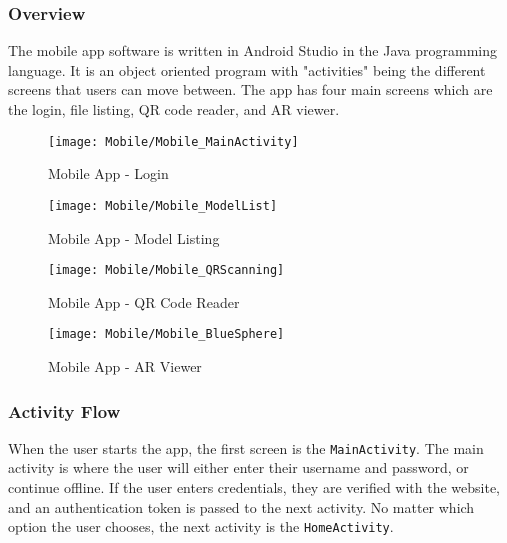     \subsubsection{Overview}
        
        The mobile app software is written in Android Studio in the Java programming language. It is an object oriented program with "activities" being the different screens that users can move between. The app has four main screens which are the login, file listing, QR code reader, and AR viewer.
        
        \begin{figure}[H]
            \texttt{[image: Mobile/Mobile\_MainActivity]}
            \centering
            \caption{Mobile App - Login}
            \label{fig:mobileLoginActivity}
        \end{figure}

        \begin{figure}[H]
            \texttt{[image: Mobile/Mobile\_ModelList]}
            \centering
            \caption{Mobile App - Model Listing}
            \label{fig:mobileModelList}
        \end{figure}

        \begin{figure}[H]
            \texttt{[image: Mobile/Mobile\_QRScanning]}
            \centering
            \caption{Mobile App - QR Code Reader}
            \label{fig:mobileQRScanning}
        \end{figure}

        \begin{figure}[H]
            \texttt{[image: Mobile/Mobile\_BlueSphere]}
            \centering
            \caption{Mobile App - AR Viewer}
            \label{fig:mobileModelViewer}
        \end{figure}

        \subsubsection{Activity Flow}

            When the user starts the app, the first screen is the \texttt{MainActivity}.  The main activity is where the user will either enter their username and password, or continue offline.  If the user enters credentials, they are verified with the website, and an authentication token is passed to the next activity.  No matter which option the user chooses, the next activity is the \texttt{HomeActivity}.

